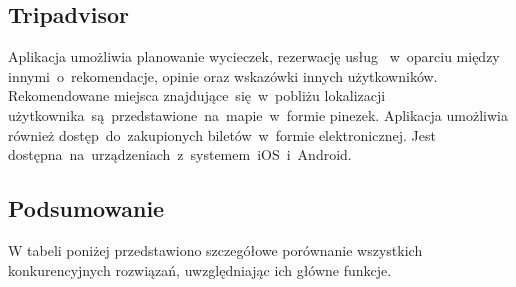 \subsection{Tripadvisor}
\label{subsec:tripadvisor}
Aplikacja umożliwia planowanie wycieczek, rezerwację usług ~w~oparciu między innymi~o~rekomendacje, opinie oraz wskazówki innych użytkowników.
Rekomendowane miejsca znajdujące~się~w~pobliżu lokalizacji użytkownika~są~przedstawione~na~mapie~w~formie pinezek.
Aplikacja umożliwia również dostęp~do~zakupionych biletów~w~formie elektronicznej.
Jest dostępna~na~urządzeniach~z~systemem~iOS~i~Android.

\subsection{Podsumowanie}
\label{subsec:podsumowanie}
W tabeli poniżej przedstawiono szczegółowe porównanie wszystkich konkurencyjnych rozwiązań, uwzględniając ich główne funkcje.

